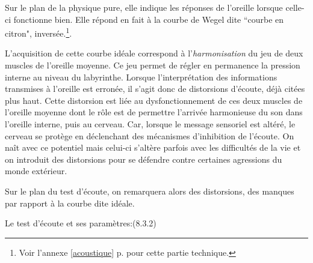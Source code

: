       
Sur le plan de la physique pure, elle indique les réponses de l'oreille
lorsque celle-ci fonctionne bien. Elle répond en fait à la courbe
de Wegel dite ``courbe en citron", inversée.\footnote{%
		Voir l'annexe \ref{acoustique} p. \pageref{acoustique}
		 pour cette partie technique.}.

               

L'acquisition de cette courbe idéale correspond à l'\textsl{harmonisation}
du jeu de deux muscles de l'oreille moyenne. Ce jeu
permet de régler en permanence la pression interne au niveau du
labyrinthe.
Lorsque l'interprétation des informations transmises à l'oreille est
erronée, il s'agit donc  de
distorsions d'écoute, déjà citées plus haut. Cette distorsion est liée au dysfonctionnement
de ces deux muscles de l'oreille moyenne dont le rôle est de permettre l'arrivée
harmonieuse du son dans l'oreille interne, puis au cerveau. Car, lorsque
le message sensoriel est altéré, le cerveau se protège en déclenchant
des mécanismes d'inhibition de l'écoute. On naît
avec ce potentiel mais celui-ci s'altère parfois avec les difficultés
de la vie et on introduit des distorsions
pour se défendre contre certaines agressions du monde extérieur. 

Sur le plan du test d'écoute, on remarquera
alors des distorsions, des manques par rapport à la courbe dite 
idéale.


Le test d'écoute et ses paramètres:(8.3.2)




  




 




  

